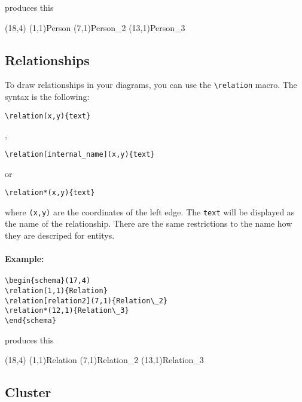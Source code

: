 \documentclass[a4paper,11pt]{article}
\begin{document}
produces this

\begin{schema}(18,4)
\entity(1,1){Person}
\entity[person2](7,1){Person\_2}
\entity*(13,1){Person\_3}
\end{schema}

\subsection{Relationships}

To draw relationships in your diagrams, you can use the \verb|\relation| macro.
The syntax is the following:

\begin{verbatim}
\relation(x,y){text}
\end{verbatim}

,

\begin{verbatim}
\relation[internal_name](x,y){text}
\end{verbatim}

or

\begin{verbatim}
\relation*(x,y){text}
\end{verbatim}

where {\tt (x,y)} are the coordinates of the left edge. The {\tt text} will be displayed as 
the name of the relationship. There are the same restrictions to the name 
how they are descriped for entitys.

\paragraph{Example:}

\begin{verbatim}
\begin{schema}(17,4)
\relation(1,1){Relation}
\relation[relation2](7,1){Relation\_2}
\relation*(12,1){Relation\_3}
\end{schema}
\end{verbatim}

produces this

\begin{schema}(18,4)
\relation(1,1){Relation}
\relation[relation2](7,1){Relation\_2}
\relation*(13,1){Relation\_3}
\end{schema}

\subsection{Cluster}
\end{document}
